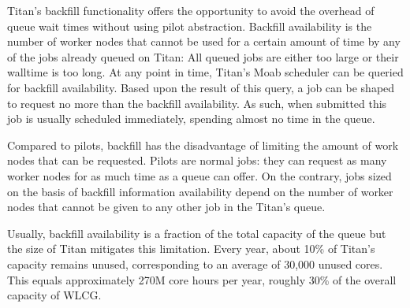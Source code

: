 Titan’s backfill functionality offers the opportunity to avoid the overhead of
queue wait times without using pilot abstraction. Backfill availability is the
number of worker nodes that cannot be used for a certain amount of time by any
of the jobs already queued on Titan: All queued jobs are either too large or
their walltime is too long. At any point in time, Titan’s Moab scheduler can be
queried for backfill availability. Based upon the result of this query, a job
can be shaped to request no more than the backfill availability. As such, when
submitted this job is usually scheduled immediately, spending almost no time in
the queue.

Compared to pilots, backfill has the disadvantage of limiting the amount of work
nodes that can be requested. Pilots are normal jobs: they can request as many
worker nodes for as much time as a queue can offer. On the contrary, jobs sized
on the basis of backfill information availability  depend on the number of worker nodes that cannot be given to
any other job in the Titan's queue.

Usually, backfill availability is a fraction of the total capacity of the queue
but the size of Titan mitigates this limitation. Every year, about 10\% of
Titan's capacity remains unused, corresponding to an average of 30,000 unused
cores. This equals approximately 270M core hours per year, roughly 30\% of the
overall capacity of WLCG.


 

